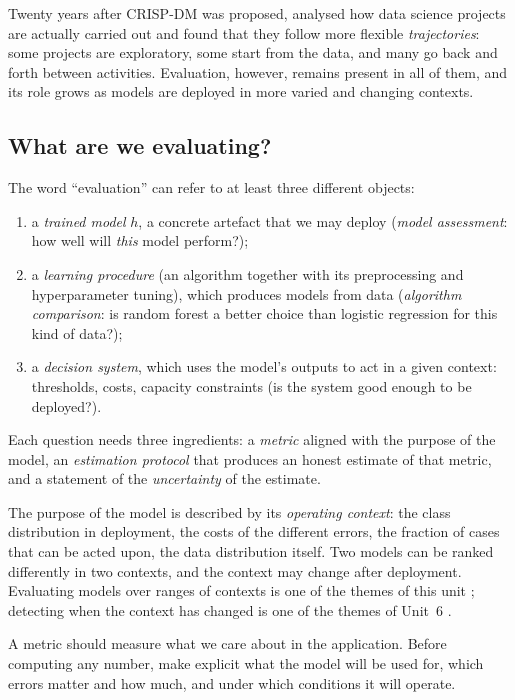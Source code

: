Twenty years after CRISP-DM was proposed, \citet{martinezplumed2021crisp} analysed how data science
projects are actually carried out and found that they follow more flexible
\emph{trajectories}: some projects are exploratory, some start from the data, and many go back and forth between activities. Evaluation, however,
remains present in all of them, and its role grows as models are deployed in more varied
and changing contexts.

\subsection{What are we evaluating?}

The word ``evaluation'' can refer to at least three different objects:
\begin{enumerate}
  \item a \emph{trained model} $h$, a concrete artefact that we may deploy
        (\emph{model assessment}: how well will \emph{this} model perform?);
  \item a \emph{learning procedure} (an algorithm together with its preprocessing and
        hyperparameter tuning), which produces models from data (\emph{algorithm comparison}:
        is random forest a better choice than logistic regression for this kind of data?);
  \item a \emph{decision system}, which uses the model's outputs to act in a given context:
        thresholds, costs, capacity constraints (is the system good enough to be deployed?).
\end{enumerate}
Each question needs three ingredients: a \emph{metric} aligned with the purpose of the model,
an \emph{estimation protocol} that produces an honest estimate of that metric, and a
statement of the \emph{uncertainty} of the estimate.

The purpose of the model is described by its \emph{operating context}: the class distribution
in deployment, the costs of the different errors, the fraction of cases that can be acted
upon, the data distribution itself. Two models can be ranked differently in two contexts,
and the context may change after deployment. Evaluating models over ranges of contexts is one of the themes of this unit
\citep{hernandez2012unified}; detecting when the context has changed is one of the themes of
Unit~6 \citep{morenotorres2012unifying}.

\begin{keyidea}
A metric should measure what we care about in the application. Before computing any number, make explicit what
the model will be used for, which errors matter and how much, and under which conditions it
will operate.
\end{keyidea}

